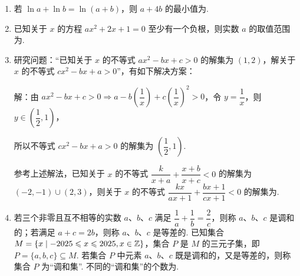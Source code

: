 \documentclass[a4paper,11pt]{article}
\begin{document}
\begin{enumerate}
\ifanswer
\solbegin
{}
\solend
\fi

\item 若 $\ln a+\ln b=\ln(a+b)$，则 $a+4b$ 的最小值为\blankline[4.4em].

\ifanswer
\solbegin
{}
\solend
\fi

\item 已知关于 $x$ 的方程 $ax^2+2x+1=0$ 至少有一个负根，则实数 $a$ 的取值范围为\blankline[4.4em].

\ifanswer
\solbegin
{}
\step{综上所述，实数 $a$ 的取值范围为 $(-\infty,1]$.}
\solend
\fi

\item 研究问题：“已知关于 $x$ 的不等式 $ax^2-bx+c>0$ 的解集为 $(1,2)$，解关于 $x$ 的不等式 $cx^2-bx+a>0$”，有如下解决方案：

解：由 $ax^2-bx+c>0\Rightarrow a-b\left(\dfrac1x\right)+c\left(\dfrac1x\right)^2>0$，令 $y=\dfrac1x$，则 $y\in\left(\dfrac12,1\right)$，

所以不等式 $cx^2-bx+a>0$ 的解集为 $\left(\dfrac12,1\right)$.

参考上述解法，已知关于 $x$ 的不等式 $\dfrac k{x+a}+\dfrac{x+b}{x+c}<0$ 的解集为 $(-2,-1)\cup(2,3)$，则关于 $x$ 的不等式 $\dfrac{kx}{ax+1}+\dfrac{bx+1}{cx+1}<0$ 的解集为\blankline[4.4em].

\ifanswer
\solbegin
{}
\solend
\fi

\item 若三个非零且互不相等的实数 $a$、$b$、$c$ 满足 $\dfrac1a+\dfrac1b=\dfrac2c$，则称 $a$、$b$、$c$ 是调和的；若满足 $a+c=2b$，则称 $a$、$b$、$c$ 是等差的. 已知集合 $M=\{x\mid-2025\leqslant x\leqslant2025,x\in\mathbb{Z}\}$，集合 $P$ 是 $M$ 的三元子集，即 $P=\{a,b,c\}\subseteq M$. 若集合 $P$ 中元素 $a$、$b$、$c$ 既是调和的，又是等差的，则称集合 $P$ 为“调和集”. 不同的“调和集”的个数为\blankline[4.4em].


\end{enumerate}
\end{document}

